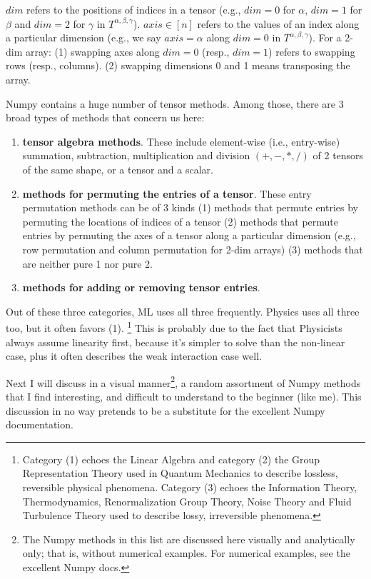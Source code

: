 $dim$
 refers to the positions
 of indices in a tensor (e.g., $dim=0$ for $\alpha$, $dim=1$ for $\beta$ and
 $dim=2$ for $\gamma$ in $T^{\alpha, \beta, \gamma}$).
$axis\in [n]$
refers to the values of an index  along a
particular dimension
(e.g., we say $axis=\alpha$ along $dim=0$ in $T^{\alpha, \beta, \gamma}$).
 For a 2-dim array: (1)
  swapping axes along $dim=0$ (resp., $dim=1$) refers
 to swapping rows
 (resp., columns).
 (2)
 swapping dimensions 0 and 1 means transposing the array.


Numpy contains a huge number of tensor methods.
Among those, there are 3 broad types of methods that concern us here:

\begin{enumerate}

\item {\bf tensor algebra methods}. These include
element-wise (i.e., entry-wise) summation, subtraction, multiplication and
division $(+,-,*,/)$ of 2 tensors of the same shape, or a tensor and a scalar.

\item
{\bf methods
for permuting  the entries of a tensor}. These
 entry permutation methods
 can be of 3 kinds
 (1) methods that
 permute entries by permuting the  locations of indices of a tensor
 (2) methods  that
 permute entries by permuting the  axes
 of a tensor along
 a particular dimension
 (e.g., row permutation and column permutation for 2-dim arrays)
(3) methods that
are neither pure 1 nor pure 2.

\item {\bf methods for adding or
removing tensor entries}.
\end{enumerate}
Out of these three categories, ML uses all three frequently.  Physics uses all three too, but it often favors (1). \footnote{
Category (1) echoes the Linear Algebra and category (2) the Group Representation Theory used in Quantum Mechanics to describe lossless, reversible physical phenomena. Category (3) echoes the Information Theory, Thermodynamics, Renormalization Group Theory, Noise Theory and Fluid Turbulence Theory used to describe lossy, irreversible phenomena.} This is
probably due to the fact
that Physicists always assume linearity  first, because it's  simpler to solve than the non-linear case, plus it often describes the weak interaction case well.

Next I will discuss in a visual manner\footnote{The Numpy methods in this list are discussed here visually and analytically only; that is, without numerical examples. For numerical examples, see the excellent Numpy docs.}, a random
assortment of Numpy
methods that I find interesting, and difficult to understand to the beginner (like me). This discussion in no way pretends to be
a substitute for the excellent Numpy documentation.

